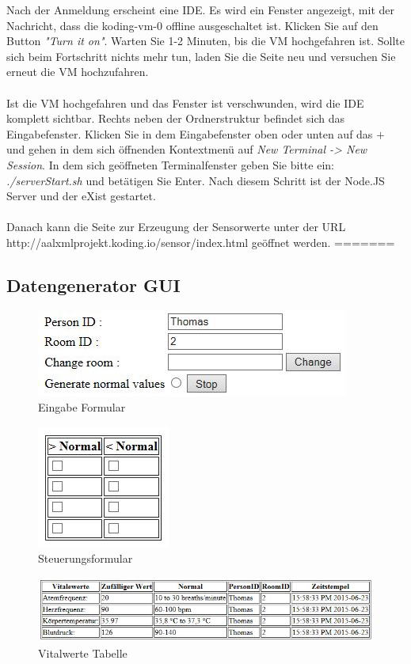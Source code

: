Nach der Anmeldung erscheint eine IDE. Es wird ein Fenster angezeigt, mit der Nachricht, dass die koding-vm-0 offline ausgeschaltet ist. Klicken Sie auf den Button \textit{"Turn it on"}. Warten Sie 1-2 Minuten, bis die VM hochgefahren ist. Sollte sich beim Fortschritt nichts mehr tun, laden Sie die Seite neu und versuchen Sie erneut die VM hochzufahren.
\\
\\
Ist die VM hochgefahren und das Fenster ist verschwunden, wird die IDE komplett sichtbar. Rechts neben der Ordnerstruktur befindet sich das Eingabefenster. Klicken Sie in dem Eingabefenster oben oder unten auf das $+$ und gehen in dem sich öffnenden Kontextmenü auf \textit{New Terminal -> New Session}. In dem sich geöffneten Terminalfenster geben Sie bitte ein: \textit{./serverStart.sh} und betätigen Sie Enter. Nach diesem Schritt ist der Node.JS Server und der eXist gestartet.
\\
\\
Danach kann die Seite zur Erzeugung der Sensorwerte unter der URL http://aalxmlprojekt.koding.io/sensor/index.html geöffnet werden.
=======
\subsection{Datengenerator GUI}
\begin{figure}[H]
	\begin{center}
		\includegraphics[scale=0.9]{images/eingabe-formular.jpg}
		\caption{Eingabe Formular}
	\end{center}
\end{figure}
\begin{figure}[H]
	\begin{center}
		\includegraphics[scale=0.9]{images/kritische-werte-tabelle.jpg}
		\caption{Steuerungsformular}
	\end{center}
\end{figure}
\begin{figure}[H]
	\begin{center}
		\includegraphics[scale=0.9]{images/vitalwerte-tabelle.jpg}
		\caption{Vitalwerte Tabelle}
	\end{center}
\end{figure}
